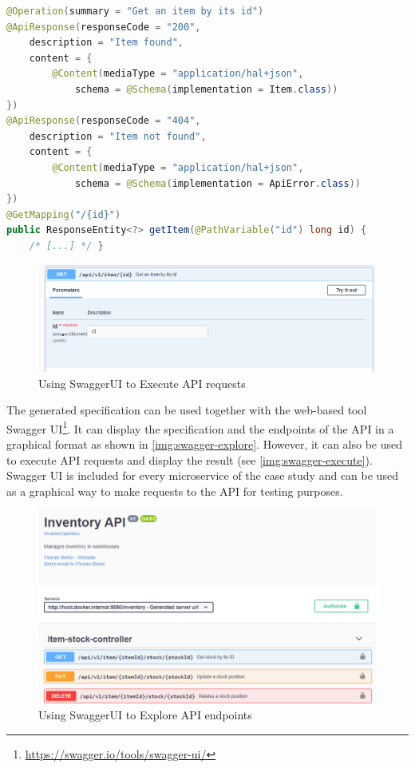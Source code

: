 \begin{lstlisting}[language=java, style=java-ext, caption={Java Annotations to Generate \acl{OAS} from Spring Controllers}, label={lst:oas-annotations}]
@Operation(summary = "Get an item by its id")
@ApiResponse(responseCode = "200", 
    description = "Item found", 
    content = {
        @Content(mediaType = "application/hal+json", 
            schema = @Schema(implementation = Item.class))
})
@ApiResponse(responseCode = "404", 
    description = "Item not found", 
    content = {
        @Content(mediaType = "application/hal+json", 
            schema = @Schema(implementation = ApiError.class))
})
@GetMapping("/{id}")
public ResponseEntity<?> getItem(@PathVariable("id") long id) { 
    /* [...] */ }
\end{lstlisting}

\begin{figure}[!htb]
    \includegraphics[width=\textwidth]{images/swagger-ui-execute.png}
    \caption{Using SwaggerUI to Execute \acs{API} requests}\label{img:swagger-execute}
\end{figure}

The generated specification can be used together with the web-based tool Swagger UI\footnote{\url{https://swagger.io/tools/swagger-ui/}}.
It can display the specification and the endpoints of the \ac{API} in a graphical format as shown in \autoref{img:swagger-explore}.
However, it can also be used to execute \ac{API} requests and display the result (see \autoref{img:swagger-execute}).
Swagger UI is included for every microservice of the case study and can be used as a graphical way to make requests to the \ac{API} for testing purposes.

\begin{figure}[!htb]
    \includegraphics[width=\textwidth]{images/swagger-ui-explore.png}
    \caption{Using SwaggerUI to Explore \acs{API} endpoints}\label{img:swagger-explore}    
\end{figure}

